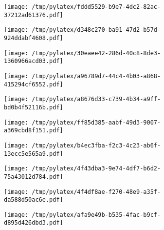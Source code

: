 \documentclass{article}
\begin{document}
\begin{figure}[htbp]
\begin{subfigure}[b]{.3\linewidth}
\texttt{[image: /tmp/pylatex/fddd5529-b9e7-4dc2-82ac-37212ad61376.pdf]}
\end{subfigure}
\begin{subfigure}[b]{.3\linewidth}
\texttt{[image: /tmp/pylatex/d348c270-ba91-47d2-b57d-924ddabf4608.pdf]}
\end{subfigure}
\begin{subfigure}[b]{.3\linewidth}
\texttt{[image: /tmp/pylatex/30eaee42-286d-40c8-8de3-1360966acd03.pdf]}
\end{subfigure}
\begin{subfigure}[b]{.3\linewidth}
\texttt{[image: /tmp/pylatex/a96789d7-44c4-4b03-a868-415294cf6552.pdf]}
\end{subfigure}
\begin{subfigure}[b]{.3\linewidth}
\texttt{[image: /tmp/pylatex/a8676d33-c739-4b34-a9ff-bd0b4f52116b.pdf]}
\end{subfigure}
\begin{subfigure}[b]{.3\linewidth}
\texttt{[image: /tmp/pylatex/ff85d385-aabf-49d3-9007-a369cbd8f151.pdf]}
\end{subfigure}
\begin{subfigure}[b]{.3\linewidth}
\texttt{[image: /tmp/pylatex/b4ec3fba-f2c3-4c23-ab6f-13ecc5e565a9.pdf]}
\end{subfigure}
\begin{subfigure}[b]{.3\linewidth}
\texttt{[image: /tmp/pylatex/4f43dba3-9e74-4df7-b6d2-75a43012d784.pdf]}
\end{subfigure}
\begin{subfigure}[b]{.3\linewidth}
\texttt{[image: /tmp/pylatex/4f4df8ae-f270-48e9-a35f-da588d50ac6e.pdf]}
\end{subfigure}
\begin{subfigure}[b]{.3\linewidth}
\texttt{[image: /tmp/pylatex/afa9e49b-b535-4fac-b9cf-d895d426dbd3.pdf]}
\end{subfigure}
\end{figure}
\end{document}
